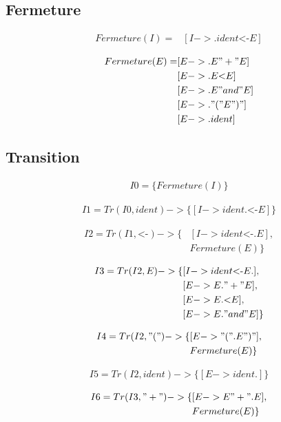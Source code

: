 \documentclass[a4paper,12pt]{article}
\begin{document}
\subsection{Fermeture}

\begin{align*}
Fermeture(I) = & [I -> . ident \text{<-} E]
\end{align*}

\begin{align*}
Fermeture(E) = & [E -> . E "+" E]\\
{} & [E -> . E \text{<} E]\\
{} & [E -> . E "and" E]\\
{} & [E -> . "(" E ")"]\\
{} & [E -> . ident]
\end{align*}

\subsection{Transition}

\begin{align*}
I0 = \{ Fermeture(I) \}
\end{align*}

\begin{align*}
I1 = Tr(I0, ident) -> \{ [I -> ident . \text{<-} E] \}
\end{align*}

\begin{align*}
I2 = Tr(I1, \text{<-}) -> \{ & [I -> ident \text{<-} . E],\\
{} & Fermeture(E) \}
\end{align*}

\begin{align*}
I3 = Tr(I2, E) -> \{ & [I -> ident \text{<-} E .],\\  
{} & [E -> E . "+" E],\\
{} & [E -> E . \text{<} E],\\ 
{} & [E -> E . "and" E] \}
\end{align*}

\begin{align*}
I4 = Tr(I2, "(") -> \{ & [E -> "(" . E ")"],\\
{} & Fermeture(E) \}
\end{align*}

\begin{align*}
I5 = Tr(I2, ident) -> \{ [E -> ident .] \}
\end{align*}

\begin{align*}
I6 = Tr(I3, "+") -> \{ & [E -> E "+" . E],\\
{} & Fermeture(E) \}
\end{align*}
\end{document}
